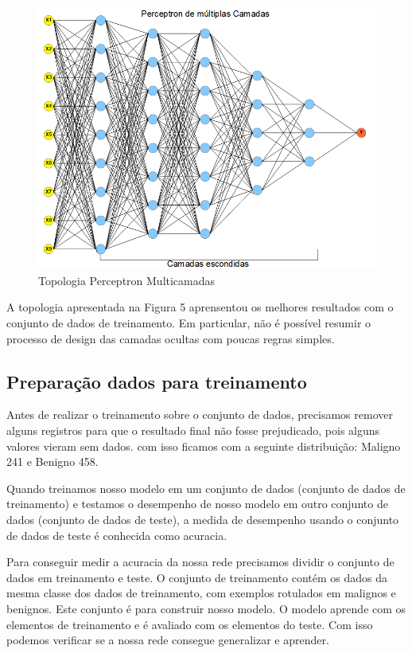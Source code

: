 \documentclass[conference]{IEEEtran}
\begin{document}
        \begin{figure}[htbp]
	\centerline{\includegraphics[scale=0.4]{Perceptron-MLP.png}}
	\caption{Topologia Perceptron Multicamadas}
	
	\label{fig}
	\end{figure}
    
    A topologia apresentada na Figura 5 aprensentou os melhores resultados com o conjunto de dados de treinamento. Em particular, não é possível resumir o processo de design das camadas ocultas com poucas regras simples. 
    
    \subsection{Preparação dados para treinamento}
    
    Antes de realizar o treinamento sobre o conjunto de dados, precisamos remover alguns registros para que o resultado final não fosse prejudicado, pois alguns valores vieram sem dados. com isso ficamos com a seguinte distribuição: Maligno 241 e Benigno 458.
    
    Quando treinamos nosso modelo em um conjunto de dados (conjunto de dados de treinamento) e testamos o desempenho de nosso modelo em outro conjunto de dados (conjunto de dados de teste), a medida de desempenho usando o conjunto de dados de teste é conhecida como acuracia. 
    
    Para conseguir medir a acuracia da nossa rede precisamos dividir o conjunto de dados em treinamento e teste. O conjunto de treinamento contém os dados da mesma classe dos dados de treinamento, com exemplos rotulados em malignos e benignos. Este conjunto é para construir nosso modelo. O modelo aprende com os elementos de treinamento e é avaliado com os elementos do teste. Com isso podemos verificar se a nossa rede consegue generalizar e aprender.
    
\end{document}
